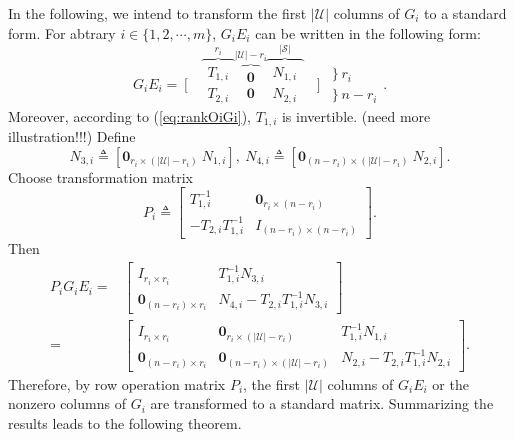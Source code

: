 \documentclass[12pt]{article}
\newcommand{\Uc}{{\mathcal{U}}}
\newcommand{\Sc}{{\mathcal{S}}}
\begin{document}
In the following, we intend to transform the first $|\Uc|$ columns of $G_i$ to a standard form. 
For abtrary $i\in\{1,2,\cdots,m\}$, $G_i E_i$ can be written in the following form:
\begin{equation}
	G_i E_i =
	\left[
	\begin{array}{c}
		{} \\ {}
	\end{array}
	\right.
	\overbrace{
		\begin{array}{c}
			T_{1,i} \\
			T_{2,i}
		\end{array}
	}^{r_i}
	\overbrace{
		\begin{array}{c}
			\mathbf{0} \\
			\mathbf{0}
		\end{array}
	}^{|\Uc|-r_i}
	\overbrace{
		\begin{array}{c}
			N_{1,i} \\
			N_{2,i}
		\end{array}
	}^{|\Sc|}
\left.
\begin{array}{c}
	{} \\ {}
\end{array}
\right]
\begin{array}{l}
	\left. \right\} r_i \\
	\left. \right\} n-r_i
\end{array} .
\end{equation}
 Moreover, according to (\ref{eq:rankOiGi}), $T_{1,i}$ is invertible. (need more illustration!!!)
 Define 
 \begin{equation*}
 	N_{3,i}\triangleq [\mathbf{0}_{r_i \times (|\Uc|-r_i)}\ N_{1,i}], \
 	N_{4,i}\triangleq [\mathbf{0}_{(n-r_i) \times (|\Uc|-r_i)}\ N_{2,i}] .
 \end{equation*}
Choose transformation matrix
\begin{equation}\label{eq:defP}
	P_i\triangleq 
	\begin{bmatrix}
		T^{-1}_{1,i} & \mathbf{0}_{r_i \times (n-r_i)} \\
		-T_{2,i}T^{-1}_{1,i} & I_{(n-r_i) \times (n-r_i)}
	\end{bmatrix}.
\end{equation}
Then 
\begin{align*}
	P_i G_i E_i = &
	\begin{bmatrix}
		I_{r_i \times r_i} & T^{-1}_{1,i} N_{3,i} \\
		\mathbf{0}_{(n-r_i) \times r_i} & N_{4,i}-T_{2,i} T^{-1}_{1,i} N_{3,i}
	\end{bmatrix}\\
=&
	\begin{bmatrix}
	I_{r_i \times r_i} & \mathbf{0}_{r_i \times (|\Uc|-r_i)}  & T^{-1}_{1,i} N_{1,i} \\
	\mathbf{0}_{(n-r_i) \times r_i} & \mathbf{0}_{(n-r_i) \times (|\Uc|-r_i)} & N_{2,i}-T_{2,i} T^{-1}_{1,i} N_{2,i}
\end{bmatrix}.
\end{align*}
Therefore, by row operation matrix $P_i$, the first $|\Uc|$ columns of $G_i E_i$ or the nonzero columns of $G_i$ are transformed to a standard matrix. Summarizing the results leads to the following theorem.
\end{document}
